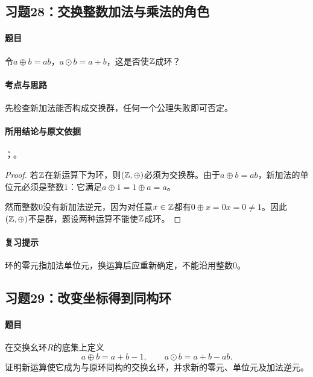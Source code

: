 \subsection{习题28：\texorpdfstring{交换整数加法与乘法的角色}{交换整数加法与乘法的角色}}
\label{ex:1:28}

\paragraph{题目}
令$a\oplus b=ab$，$a\odot b=a+b$，这是否使$\mathbb Z$成环？

\paragraph{考点与思路}
先检查新加法能否构成交换群，任何一个公理失败即可否定。

\paragraph{所用结论与原文依据}
；。


\begin{proof}
若$\mathbb Z$在新运算下为环，则$(\mathbb Z,\oplus)$必须为交换群。由于$a\oplus b=ab$，新加法的单位元必须是整数$1$：它满足$a\oplus1=1\oplus a=a$。

然而整数$0$没有新加法逆元，因为对任意$x\in\mathbb Z$都有$0\oplus x=0x=0\ne1$。因此$(\mathbb Z,\oplus)$不是群，题设两种运算不能使$\mathbb Z$成环。
\end{proof}

\paragraph{复习提示}
环的零元指加法单位元，换运算后应重新确定，不能沿用整数0。


\subsection{习题29：\texorpdfstring{改变坐标得到同构环}{改变坐标得到同构环}}
\label{ex:1:29}

\paragraph{题目}
在交换幺环$R$的底集上定义
\[
a\oplus b=a+b-1,\qquad a\odot b=a+b-ab.
\]
证明新运算使它成为与原环同构的交换幺环，并求新的零元、单位元及加法逆元。

